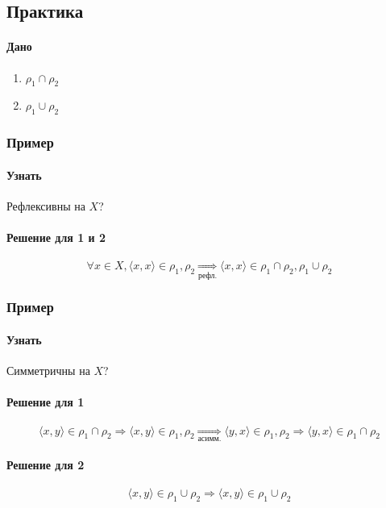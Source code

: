 \documentclass{article}
\begin{document}
\subsection{Практика}
\paragraph{Дано}
\begin{enumerate}
    \item $\rho_1 \cap \rho_2$
    \item $\rho_1 \cup \rho_2$
\end{enumerate}

\subsubsection{Пример}
\paragraph{Узнать}
Рефлексивны на $X$?

\paragraph{Решение для 1 и 2}
\[
    \forall x \in X, \langle x, x \rangle \in \rho_1, \rho_2 \underset{\text{рефл.}}{\Rightarrow} \langle x, x \rangle \in \rho_1 \cap \rho_2, \rho_1 \cup \rho_2
\]


\subsubsection{Пример}
\paragraph{Узнать}
Симметричны на $X$?

\paragraph{Решение для 1}
\[
    \langle x, y \rangle \in \rho_1 \cap \rho_2 \Rightarrow \langle x, y \rangle \in \rho_1, \rho_2 \underset{\text{асимм.}}{\Rightarrow} \langle y, x \rangle \in \rho_1, \rho_2 \Rightarrow \langle y, x \rangle \in \rho_1 \cap \rho_2
\]

\paragraph{Решение для 2}
\[
    \langle x, y \rangle \in \rho_1 \cup \rho_2 \Rightarrow \langle x, y \rangle \in \rho_1 \cup \rho_2
\]
\end{document}
